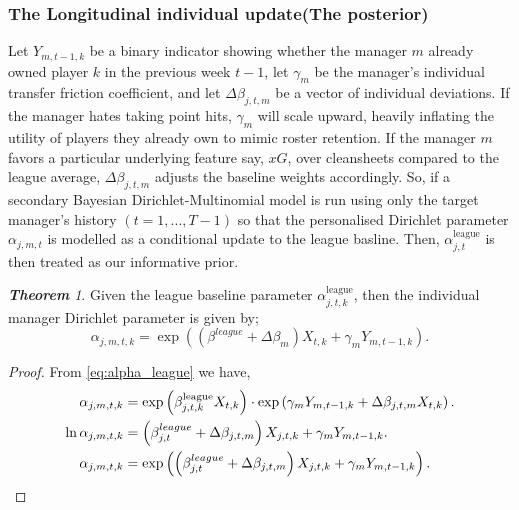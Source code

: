 \documentclass[12pt,oneside,a4paper]{book}
\theoremstyle{definition}
\theoremstyle{remark}
\newtheorem{thm}{\bf Theorem}[subsection]
\begin{document}
				\subsubsection{The Longitudinal individual update(The posterior)}
				Let $Y_{m,t-1,k}$ be a binary indicator showing whether the manager $m$ already owned player $k$ in the previous week $t-1$, let $\gamma_m$ be the manager's individual transfer friction coefficient, and let $\Delta\beta_{j,t,m}$ be a vector of individual deviations. If the manager hates taking point hits, $\gamma_m$ will scale upward, heavily inflating the utility of players they already own to mimic roster retention. If the manager $m$ favors a particular underlying feature say, $xG$, over cleansheets compared to the league average, $\Delta\beta_{j,t,m}$ adjusts the baseline weights accordingly. So, if a secondary Bayesian Dirichlet-Multinomial model is run using only the target manager's history $(t=1, ..., T-1)$ so that the personalised Dirichlet parameter $\alpha_{j,m,t}$ is modelled as a conditional update to the league basline. Then, $\alpha_{j,t}^{\text{league}}$ is then treated as our informative prior.

				\begin{thm}
					Given the league baseline parameter $\alpha^{\text{league}}_{j,t,k}$, then the individual manager Dirichlet parameter is given by;
					\begin{equation}\label{Eq:alpha_m}
						\alpha_{j,m,t,k} = \exp\left( \left(\beta^{league} + \Delta\beta_m\right)X_{t,k} + \gamma_mY_{m,t-1,k}\right).
					\end{equation}
				\end{thm}
				\begin{proof}
					From \ref{eq:alpha_league} we have,
					\[
						\begin{aligned}
							\alpha_{j,m,t,k} &= \exp\left( \beta^{\text{league}}_{j,t,k} X_{t,k} \right) \cdot \exp\left(\gamma_m Y_{m,t-1,k} + \boldmath{\Delta}\beta_{j,t,m}X_{t,k} \right).\\
							\ln\alpha_{j,m,t,k} &= \left( \beta^{league}_{j,t} + \Delta\beta_{j,t,m}\right)X_{j,t,k} + \gamma_mY_{m,t-1,k}.\\
							\alpha_{j,m,t,k} &= \exp\left( \left( \beta^{league}_{j,t} + \Delta\beta_{j,t,m}\right)X_{j,t,k} + \gamma_mY_{m,t-1,k} \right).
						\end{aligned}
					\]

				\end{proof}
\end{document}
